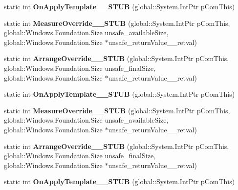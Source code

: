 \begin{DoxyCompactItemize}
static int {\bfseries On\+Apply\+Template\+\_\+\+\_\+\+S\+T\+UB} (global\+::\+System.\+Int\+Ptr p\+Com\+This)
\item 
\mbox{\label{struct_windows_1_1_u_i_1_1_xaml_1_1_i_framework_element_overrides_____impl_1_1_vtbl_a5e90f05f7e53cc029590bf156c3f4fc2}} 
static int {\bfseries Measure\+Override\+\_\+\+\_\+\+S\+T\+UB} (global\+::\+System.\+Int\+Ptr p\+Com\+This, global\+::\+Windows.\+Foundation.\+Size unsafe\+\_\+available\+Size, global\+::\+Windows.\+Foundation.\+Size $\ast$unsafe\+\_\+return\+Value\+\_\+\+\_\+retval)
\item 
\mbox{\label{struct_windows_1_1_u_i_1_1_xaml_1_1_i_framework_element_overrides_____impl_1_1_vtbl_a2177ef78910883f57615b7031eb3275d}} 
static int {\bfseries Arrange\+Override\+\_\+\+\_\+\+S\+T\+UB} (global\+::\+System.\+Int\+Ptr p\+Com\+This, global\+::\+Windows.\+Foundation.\+Size unsafe\+\_\+final\+Size, global\+::\+Windows.\+Foundation.\+Size $\ast$unsafe\+\_\+return\+Value\+\_\+\+\_\+retval)
\item 
\mbox{\label{struct_windows_1_1_u_i_1_1_xaml_1_1_i_framework_element_overrides_____impl_1_1_vtbl_a841071145d85fc2688f3ab08ddfce8e4}} 
static int {\bfseries On\+Apply\+Template\+\_\+\+\_\+\+S\+T\+UB} (global\+::\+System.\+Int\+Ptr p\+Com\+This)
\item 
\mbox{\label{struct_windows_1_1_u_i_1_1_xaml_1_1_i_framework_element_overrides_____impl_1_1_vtbl_a5e90f05f7e53cc029590bf156c3f4fc2}} 
static int {\bfseries Measure\+Override\+\_\+\+\_\+\+S\+T\+UB} (global\+::\+System.\+Int\+Ptr p\+Com\+This, global\+::\+Windows.\+Foundation.\+Size unsafe\+\_\+available\+Size, global\+::\+Windows.\+Foundation.\+Size $\ast$unsafe\+\_\+return\+Value\+\_\+\+\_\+retval)
\item 
\mbox{\label{struct_windows_1_1_u_i_1_1_xaml_1_1_i_framework_element_overrides_____impl_1_1_vtbl_a2177ef78910883f57615b7031eb3275d}} 
static int {\bfseries Arrange\+Override\+\_\+\+\_\+\+S\+T\+UB} (global\+::\+System.\+Int\+Ptr p\+Com\+This, global\+::\+Windows.\+Foundation.\+Size unsafe\+\_\+final\+Size, global\+::\+Windows.\+Foundation.\+Size $\ast$unsafe\+\_\+return\+Value\+\_\+\+\_\+retval)
\item 
\mbox{\label{struct_windows_1_1_u_i_1_1_xaml_1_1_i_framework_element_overrides_____impl_1_1_vtbl_a841071145d85fc2688f3ab08ddfce8e4}} 
static int {\bfseries On\+Apply\+Template\+\_\+\+\_\+\+S\+T\+UB} (global\+::\+System.\+Int\+Ptr p\+Com\+This)
\end{DoxyCompactItemize}
